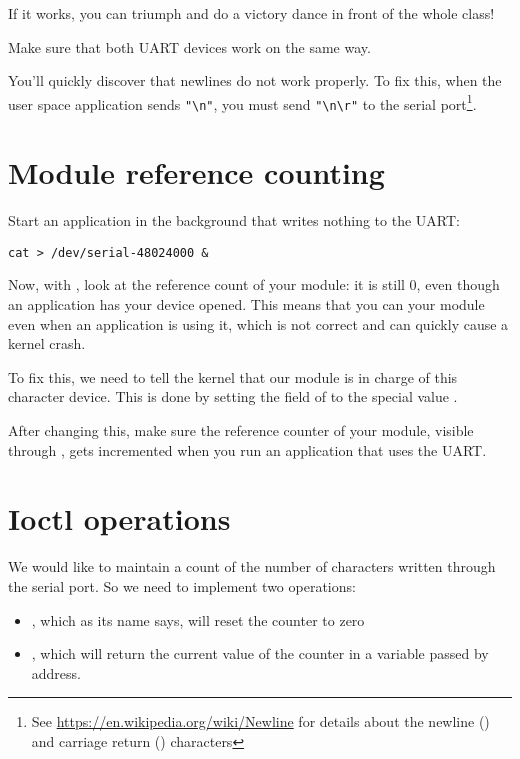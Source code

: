 If it works, you can triumph and do a victory dance in front of the
whole class!

Make sure that both UART devices work on the same way.

You'll quickly discover that newlines do not work properly. To fix
this, when the user space application sends \verb+"\n"+, you must send
\verb+"\n\r"+ to the serial port\footnote{See
\url{https://en.wikipedia.org/wiki/Newline} for details about the
newline (\code{\n}) and carriage return (\code{\r}) characters}.

\section{Module reference counting}

Start an application in the background that writes nothing to the
UART:

\begin{verbatim}
cat > /dev/serial-48024000 &
\end{verbatim}

Now, with , look at the reference count of your module: it
is still 0, even though an application has your device opened. This
means that you can  your module even when an application
is using it, which is not correct and can quickly cause a kernel
crash.

To fix this, we need to tell the kernel that our module is in charge
of this character device. This is done by setting the 
field of  to the special value
.

After changing this, make sure the reference counter of your module,
visible through , gets incremented when you run an
application that uses the UART.

\section{Ioctl operations}

We would like to maintain a count of the number of characters
written through the serial port. So we need to implement two
 operations:
\begin{itemize}

 \item {}, which as its name says, will
   reset the counter to zero

 \item {}, which will return the current
   value of the counter in a variable passed by address.

\end{itemize}

